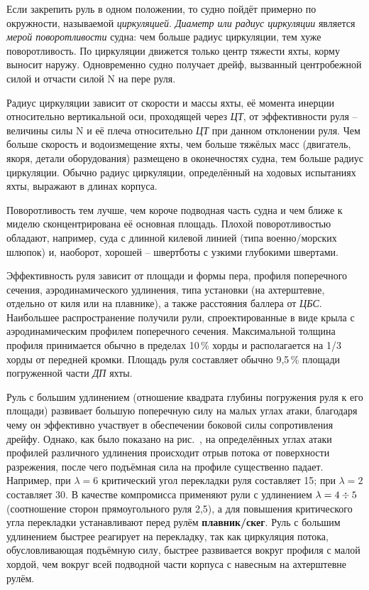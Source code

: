Если закрепить руль в одном положении, то судно пойдёт примерно по
окружности, называемой \textit{циркуляцией}.  \textit{Диаметр или
радиус циркуляции} является \textit{мерой
поворотливости}
судна: чем больше радиус циркуляции, тем хуже поворотливость. По
циркуляции движется только центр тяжести яхты, корму выносит
наружу. Одновременно судно получает дрейф, вызванный центробежной
силой и отчасти силой \ve N на пере руля.

Радиус циркуляции зависит от скорости и массы яхты, её момента инерции
относительно вертикальной оси, проходящей через \textit{ЦТ}, от
эффективности руля \--- величины силы \ve N и её плеча относительно
\textit{ЦТ} при данном отклонении руля. Чем больше скорость и
водоизмещение яхты, чем больше тяжёлых масс (двигатель, якоря, детали
оборудования) размещено в оконечностях судна, тем больше радиус
циркуляции. Обычно радиус циркуляции, определённый на ходовых
испытаниях яхты, выражают в длинах корпуса.

Поворотливость тем лучше, чем короче подводная часть судна и чем ближе
к миделю сконцентрирована её основная площадь. Плохой поворотливостью
обладают, например, суда с длинной килевой линией (типа
военно\-/морских шлюпок) и, наоборот, хорошей \--- швертботы с узкими
глубокими швертами.

Эффективность руля зависит от площади и формы пера, профиля
поперечного сечения, аэродинамического удлинения, типа установки (на
ахтерштевне, отдельно от киля или на плавнике), а также расстояния
баллера от \textit{ЦБС}. Наибольшее распространение получили рули,
спроектированные в виде крыла с аэродинамическим профилем поперечного
сечения. Максимальной толщина профиля принимается обычно в пределах
10\,\% хорды и располагается на 1/3 хорды от передней
кромки. Площадь руля составляет обычно 9,5\,\% площади
погруженной части \textit{ДП} яхты.

Руль с большим удлинением (отношение квадрата глубины погружения руля
к его площади) развивает большую поперечную силу на малых углах атаки,
благодаря чему он эффективно участвует в обеспечении боковой силы
сопротивления дрейфу. Однако, как было показано на рис.~, на
определённых углах атаки профилей различного удлинения происходит
отрыв потока от поверхности разрежения, после чего подъёмная сила на
профиле существенно падает. Например, при $\lambda = 6$ критический
угол перекладки руля составляет 15\gr; при $\lambda = 2$ составляет
30\gr. В качестве компромисса применяют рули с удлинением
$\lambda = 4 \div 5$ (соотношение сторон прямоугольного руля 2,5), а для повышения критического угла перекладки устанавливают перед
рулём \textbf{плавник\-/скег}. Руль с большим удлинением быстрее реагирует на
перекладку, так как циркуляция потока, обусловливающая подъёмную силу,
быстрее развивается вокруг профиля с малой хордой, чем вокруг всей
подводной части корпуса с навесным на ахтерштевне рулём.


